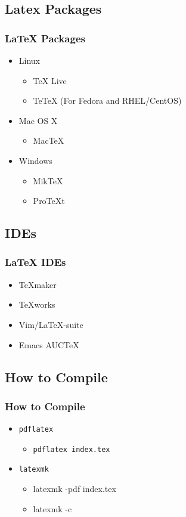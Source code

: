 
\subsection{Latex Packages}

\begin{frame}
\frametitle{\LaTeX{} Packages}
\begin{itemize}
    \item Linux
    \begin{itemize}
        \item TeX Live
        \item TeTeX (For Fedora and RHEL/CentOS)
    \end{itemize}
    \item Mac OS X
    \begin{itemize}
        \item MacTeX
    \end{itemize}
    \item Windows
    \begin{itemize}
        \item MikTeX
        \item ProTeXt
    \end{itemize}
\end{itemize}
\end{frame}

\subsection{IDEs}

\begin{frame}
\frametitle{\LaTeX{} IDEs}
\begin{itemize}
    \item TeXmaker
    \item TeXworks
    \item Vim/LaTeX-suite
    \item Emacs AUCTeX
\end{itemize}
\end{frame}

\subsection{How to Compile}

\begin{frame}
\frametitle{How to Compile}
\begin{itemize}
    \item \texttt{pdflatex}
    \begin{itemize}
        \item \texttt{pdflatex index.tex}
    \end{itemize}
    \item \texttt{latexmk}
    \begin{itemize}
        \item latexmk -pdf index.tex
        \item latexmk -c
    \end{itemize}
\end{itemize}
\end{frame}
